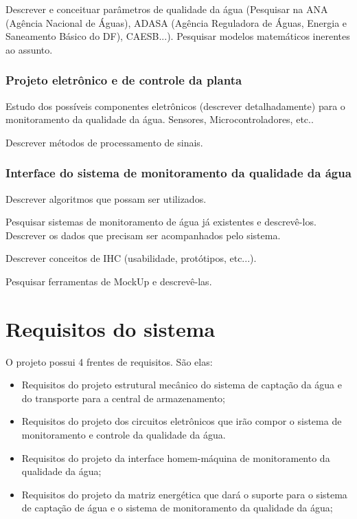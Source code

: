       Descrever e conceituar parâmetros de qualidade da água
      (Pesquisar na ANA (Agência Nacional de Águas), ADASA (Agência Reguladora de Águas, Energia e Saneamento Básico do DF), CAESB...).
      Pesquisar modelos matemáticos inerentes ao assunto.
    
      \subsubsection{Projeto eletrônico e de controle da planta}
      
      Estudo dos possíveis componentes eletrônicos (descrever detalhadamente) para o monitoramento da qualidade da água.
	Sensores, Microcontroladores, etc..
	
      Descrever métodos de processamento de sinais.
      
      \subsubsection{Interface do sistema de monitoramento da qualidade da água}
      
      Descrever algoritmos que possam ser utilizados.
      
      Pesquisar sistemas de monitoramento de água já existentes e descrevê-los.
      Descrever os dados que precisam ser acompanhados pelo sistema.
      
      Descrever conceitos de IHC (usabilidade, protótipos, etc...).
      
      Pesquisar ferramentas de MockUp e descrevê-las.
    
  \section{Requisitos do sistema}
  
      O projeto possui 4 frentes de requisitos. São elas:
      
      \begin{itemize}
	\item Requisitos do projeto estrutural mecânico do sistema de captação da água e do transporte para a central de armazenamento;
	\item Requisitos do projeto dos circuitos eletrônicos que irão compor o sistema de monitoramento e controle da qualidade da água.
	\item Requisitos do projeto da interface homem-máquina de monitoramento da qualidade da água;
	\item Requisitos do projeto da matriz energética que dará o suporte para o sistema de captação de água e o sistema de monitoramento da qualidade da água;
      \end{itemize}
    
    
    
    
